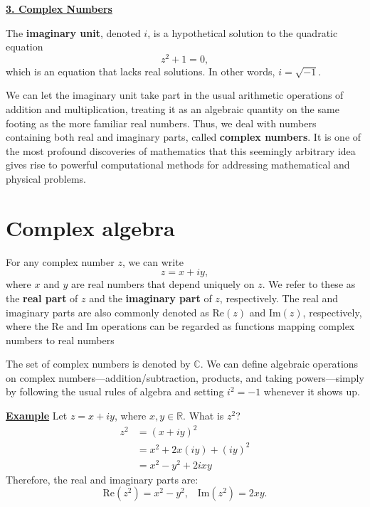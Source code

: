 \documentclass[10pt,a4paper]{article}
\begin{document}
\setcounter{page}{18}
\noindent
\underline{\textbf{\LARGE 3. Complex Numbers}}
\vskip 0.1in

The \textbf{imaginary unit}, denoted $i$, is a hypothetical solution
to the quadratic equation
\begin{equation}
z^2 + 1 = 0,
\end{equation}
which is an equation that lacks real solutions. In other words, $i =
\sqrt{-1}$.

We can let the imaginary unit take part in the usual arithmetic
operations of addition and multiplication, treating it as an algebraic
quantity on the same footing as the more familiar real numbers. Thus,
we deal with numbers containing both real and imaginary parts, called
\textbf{complex numbers}. It is one of the most profound discoveries
of mathematics that this seemingly arbitrary idea gives rise to
powerful computational methods for addressing mathematical and
physical problems.

\section{Complex algebra}
\label{complex-algebra}

For any complex number $z$, we can write
\begin{equation}
  z = x + i y,
\end{equation}
where $x$ and $y$ are real numbers that depend uniquely on $z$. We
refer to these as the \textbf{real part} of $z$ and the
\textbf{imaginary part} of $z$, respectively.  The real and imaginary
parts are also commonly denoted as $\mathrm{Re}(z)$ and
$\mathrm{Im}(z)$, respectively, where the $\mathrm{Re}$ and
$\mathrm{Im}$ operations can be regarded as functions mapping complex
numbers to real numbers

The set of complex numbers is denoted by $\mathbb{C}$. We can define
algebraic operations on complex numbers---addition/subtraction,
products, and taking powers---simply by following the usual rules of
algebra and setting $i^2 = -1$ whenever it shows up.

\begin{framed}
\noindent
\underline{\textbf{Example}}
\vskip 0.1in \noindent
Let $z = x + i y$, where $x, y \in \mathbb{R}$. What is
$z^2$?
\begin{align}
  z^2 &= (x+iy)^2 \\
  &= x^2 + 2x(iy) + (iy)^2 \\
  &= x^2 - y^2 + 2ixy
\end{align}
Therefore, the real and imaginary parts are:
\begin{equation}
\mathrm{Re}(z^2) = x^2 -y^2, \;\;\; \mathrm{Im}(z^2) = 2xy.
\end{equation}
\end{framed}
\end{document}
